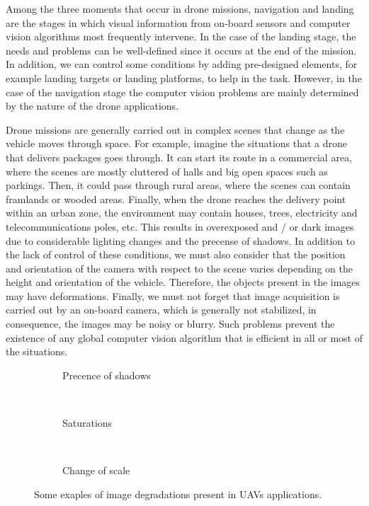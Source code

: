 Among the three moments that occur in drone missions, navigation and landing are the stages in which visual information from on-board sensors and computer vision algorithms most frequently intervene. In the case of the landing stage, the needs and problems can be well-defined since it occurs at the end of the mission. In addition, we can control some conditions by adding pre-designed elements, for example landing targets or landing platforms, to help in the task. However, in the case of the navigation stage the computer vision problems are mainly determined by the nature of the drone applications. 

Drone missions are generally carried out in complex scenes that change as the vehicle moves through space. For example, imagine the situations that a drone that delivers packages goes through. It can start its route in a commercial area, where the scenes are mostly cluttered of halls and big open spaces such as parkings. Then, it could pass through rural areas, where the scenes can contain framlands or wooded areas. Finally, when the drone reaches the delivery point within an urban zone, the environment may contain houses, trees, electricity and telecommunications poles, etc. This results in overexposed and / or dark images due to considerable lighting changes and the precense of shadows. In addition to the lack of control of these conditions, we must also consider that the position and orientation of the camera with respect to the scene varies depending on the height and orientation of the vehicle. Therefore, the objects present in the images may have deformations. Finally, we must not forget that image acquisition is carried out by an on-board camera, which is generally not stabilized, in consequence, the images may be noisy or blurry. Such problems prevent the existence of any global computer vision algorithm that is efficient in all or most of the situations. 


\begin{figure}[!ht]
    \centering
    \begin{subfigure}[b]{0.32\textwidth}
        \caption{Precence of shadows}
    \end{subfigure}
        ~ %
    \begin{subfigure}[b]{0.32\textwidth}
        \caption{Saturations}
    \end{subfigure}
        ~ %
    \begin{subfigure}[b]{0.32\textwidth}
        \caption{Change of scale}
    \end{subfigure} 
    \caption{Some exaples of image degradations present in UAVs applications.}\label{fig:img_drone_degradations}
\end{figure}

